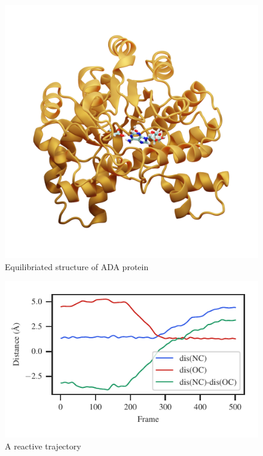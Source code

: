 \documentclass[journal=jpcbfk,manuscript=article,layout=twocolumn]{achemso}
\begin{document}
\begin{figure}[ht!]
\centering
\includegraphics[scale=0.2]{./figures/ada-equil.png}
\caption{Equilibriated structure of ADA protein}
\label{fig:ada-equil}
\end{figure}

\begin{figure}
\includegraphics[scale=1.0]{figures/ada-diff60.pdf}
\caption{A reactive trajectory}
\label{fig:ada-reactive-traj}
\end{figure}
\end{document}
